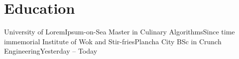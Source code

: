 \section{Education}
\resumeSubHeadingListStart
    \resumeSubheading
      {University of Lorem}{Ipsum-on-Sea}
      {Master in Culinary Algorithms}{Since time immemorial}
    \resumeSubheading
      {Institute of Wok and Stir-fries}{Plancha City}
      {BSc in Crunch Engineering}{Yesterday -- Today}
\resumeSubHeadingListEnd
